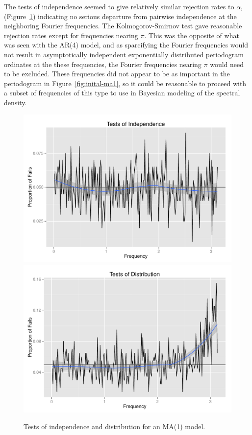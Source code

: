 \documentclass{article}\usepackage{graphicx, color}
\newenvironment{knitrout}{}{} %
\theoremstyle{plain}
\begin{document}
The tests of independence seemed to give relatively similar rejection rates to $\alpha$, (Figure~\ref{fig:tests-ma1}) indicating no serious departure from pairwise independence at the neighboring Fourier frequencies. The Kolmogorov-Smirnov test gave reasonable rejection rates except for frequencies nearing $\pi$. This was the opposite of what was seen with the AR(4) model, and as sparcifying the Fourier frequencies would not result in asymptotically independent exponentially distributed periodogram ordinates at the these frequencies, the Fourier frequencies nearing $\pi$ would need to be excluded. These frequencies did not appear to be as important in the periodogram in Figure~\ref{fig:inital-ma1}, so it could be reasonable to proceed with a subset of frequencies of this type to use in Bayesian modeling of the spectral density. 

\begin{knitrout}
\color{fgcolor}\begin{figure}[H]

\includegraphics[width=.49\textwidth]{figure/tests-ma11} 
\includegraphics[width=.49\textwidth]{figure/tests-ma12} \caption[Tests of independence and distribution for an MA(1) model]{Tests of independence and distribution for an MA(1) model.\label{fig:tests-ma1}}
\end{figure}


\end{knitrout}


% 
% 
\end{document}
